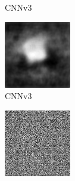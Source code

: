 \begin{figure}[H]
\begin{subfigure}[t]{0.13\textwidth}
    \caption{CNNv3}
  \end{subfigure}
  \begin{subfigure}[t]{0.13\textwidth}
    \centering
    \includegraphics[width=\linewidth]{img/one-trial/intermediate-cnnv3/prediction_3.png}
    \caption{CNNv3}
  \end{subfigure}
  \begin{subfigure}[t]{0.13\textwidth}
    \centering
    \includegraphics[width=\linewidth]{img/one-trial/intermediate-cnnv4/intermediate_3.png}

\end{subfigure}
\end{figure}
